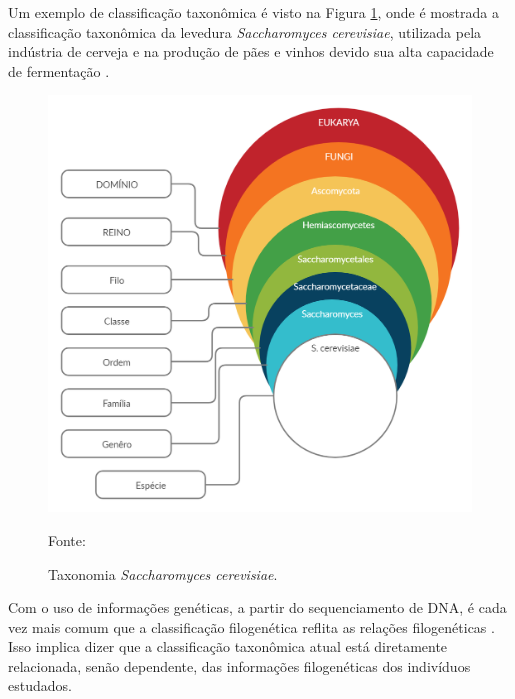 \documentclass[tcc2]{classe_uftex/uftex}
\begin{document}
Um exemplo de classificação taxonômica é visto na Figura \ref{fig:fig002}, onde é mostrada a classificação taxonômica da levedura \emph{Saccharomyces cerevisiae}, utilizada pela indústria de cerveja e na produção de pães e vinhos devido sua alta capacidade de fermentação \cite{2008:Trabulsi}.
    \begin{figure}[hbt]
    \centering
      \includegraphics[scale=0.3]{TCC_Johnny/img/H_Taxonomica.png}
      \caption{Taxonomia \emph{Saccharomyces cerevisiae}.}
      \raggedright \scriptsize \centering Fonte: 
      \label{fig:fig002}
    \end{figure} %

Com o uso de informações genéticas, a partir do sequenciamento de DNA, é cada vez mais comum que a classificação filogenética reflita as relações filogenéticas \cite{2016:Madigan}. Isso implica dizer que a classificação taxonômica atual está diretamente relacionada, senão dependente, das informações filogenéticas dos indivíduos estudados.
\end{document}
